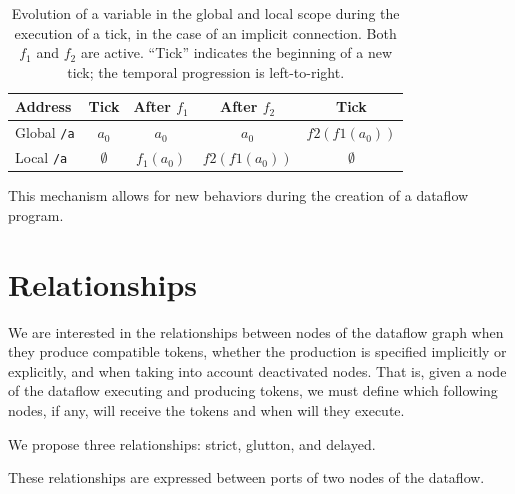 \documentclass{article}
\begin{document}
\begin{table}[h]
	\centering
	\footnotesize
	\begin{tabular}{l|cccc}
		Address & Tick & After $f_1$ & After $f_2$ & Tick \\
		\midrule
		Global \lstinline|/a|  & $a_0$ & $a_0$ & $a_0$ & $f2(f1(a_0))$\\
		Local \lstinline|/a|   & $\emptyset$ & $f_1(a_0)$ & $f2(f1(a_0))$ & $\emptyset$ \\	
	\end{tabular}
	\caption{Evolution of a variable in the global and local scope during the execution of a tick, in the case of an implicit connection. Both $f_1$ and $f_2$ are active. 
        ``Tick'' indicates the beginning of a new tick; the temporal progression is left-to-right.}
	\label{tbl.evolution}
\end{table}

This mechanism allows for new behaviors during the creation of a dataflow program.

	
	
    
\section{Relationships}
\label{sec.relationships}
We are interested in the relationships between nodes of the dataflow graph when they produce compatible tokens, whether the production is specified implicitly or explicitly, and when taking into account deactivated nodes.
That is, given a node of the dataflow executing and producing tokens, we must define which following nodes, if any, will receive the tokens and when will they execute.
    
We propose three relationships: strict, glutton, and delayed.

These relationships are expressed between ports of two nodes of the dataflow.
\end{document}
